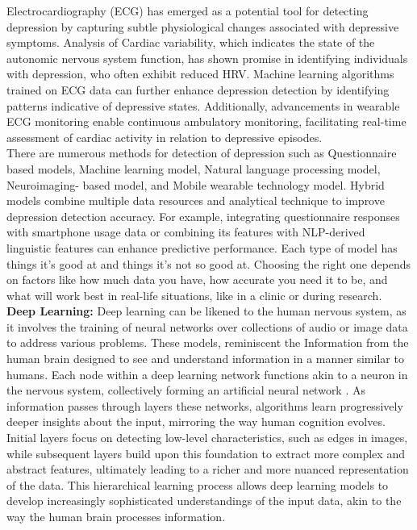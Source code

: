 Electrocardiography (ECG) has emerged as a potential tool for detecting depression by capturing subtle physiological changes associated with depressive symptoms. Analysis of Cardiac variability, which indicates the state of the autonomic nervous system function, has shown promise in identifying individuals with depression, who often exhibit reduced HRV.  Machine learning algorithms trained on ECG data can further enhance depression detection by identifying patterns indicative of depressive states. Additionally, advancements in wearable ECG monitoring enable continuous ambulatory monitoring, facilitating real-time assessment of cardiac activity in relation to depressive episodes.
\\There are numerous methods for detection of depression such as Questionnaire based models, Machine learning model, Natural language processing model, Neuroimaging- based model, and Mobile wearable technology model. Hybrid models combine multiple data resources and analytical technique to improve depression detection accuracy. For example, integrating questionnaire responses with smartphone usage data or combining its features with NLP\cite{chowdhary2020natural}-derived linguistic features can enhance predictive performance.
Each type of model has things it's good at and things it's not so good at. Choosing the right one depends on factors like how much data you have, how accurate you need it to be, and what will work best in real-life situations, like in a clinic or during research.
\\
\textbf{Deep Learning:} Deep learning can be likened to the human nervous system, as it involves the training of neural networks over collections of audio or image data to address various problems. These models, reminiscent the  Information from the human brain designed to see and understand information in a manner similar to humans. Each node within a deep learning network functions akin to a neuron in the nervous system, collectively forming an artificial neural network \cite{goodfellow2016deep}. As information passes through layers these networks, algorithms learn progressively deeper insights about the input, mirroring the way human cognition evolves. Initial layers focus on detecting low-level characteristics, such as edges in images, while subsequent layers build upon this foundation to extract more complex and abstract features, ultimately leading to a richer and more nuanced representation of the data. This hierarchical learning process allows deep learning models to develop increasingly sophisticated understandings of the input data, akin to the way the human brain processes information.
